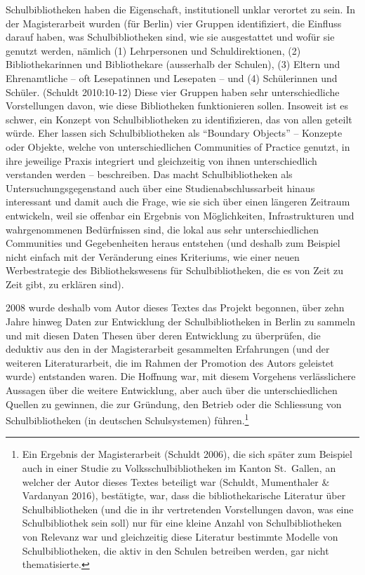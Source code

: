 \documentclass[a4paper,
fontsize=11pt,
oneside,
numbers=noperiodatend,
parskip=half-,
bibliography=totoc,
final
]{scrartcl}
\begin{document}
Schulbibliotheken haben die Eigenschaft, institutionell unklar verortet
zu sein. In der Magisterarbeit wurden (für Berlin) vier Gruppen
identifiziert, die Einfluss darauf haben, was Schulbibliotheken sind,
wie sie ausgestattet und wofür sie genutzt werden, nämlich (1)
Lehrpersonen und Schuldirektionen, (2) Bibliothekarinnen und
Bibliothekare (ausserhalb der Schulen), (3) Eltern und Ehrenamtliche --
oft Lesepatinnen und Lesepaten -- und (4) Schülerinnen und Schüler.
(Schuldt 2010:10-12) Diese vier Gruppen haben sehr unterschiedliche
Vorstellungen davon, wie diese Bibliotheken funktionieren sollen.
Insoweit ist es schwer, ein Konzept von Schulbibliotheken zu
identifizieren, das von allen geteilt würde. Eher lassen sich
Schulbibliotheken als \enquote{Boundary Objects} -- Konzepte oder
Objekte, welche von unterschiedlichen Communities of Practice genutzt,
in ihre jeweilige Praxis integriert und gleichzeitig von ihnen
unterschiedlich verstanden werden -- beschreiben. Das macht
Schulbibliotheken als Untersuchungsgegenstand auch über eine
Studienabschlussarbeit hinaus interessant und damit auch die Frage, wie
sie sich über einen längeren Zeitraum entwickeln, weil sie offenbar ein
Ergebnis von Möglichkeiten, Infrastrukturen und wahrgenommenen
Bedürfnissen sind, die lokal aus sehr unterschiedlichen Communities und
Gegebenheiten heraus entstehen (und deshalb zum Beispiel nicht einfach
mit der Veränderung eines Kriteriums, wie einer neuen Werbestrategie des
Bibliothekswesens für Schulbibliotheken, die es von Zeit zu Zeit gibt,
zu erklären sind).

2008 wurde deshalb vom Autor dieses Textes das Projekt begonnen, über
zehn Jahre hinweg Daten zur Entwicklung der Schulbibliotheken in Berlin
zu sammeln und mit diesen Daten Thesen über deren Entwicklung zu
überprüfen, die deduktiv aus den in der Magisterarbeit gesammelten
Erfahrungen (und der weiteren Literaturarbeit, die im Rahmen der
Promotion des Autors geleistet wurde) entstanden waren. Die Hoffnung
war, mit diesem Vorgehens verlässlichere Aussagen über die weitere
Entwicklung, aber auch über die unterschiedlichen Quellen zu gewinnen,
die zur Gründung, den Betrieb oder die Schliessung von Schulbibliotheken
(in deutschen Schulsystemen) führen.\footnote{Ein Ergebnis der
  Magisterarbeit (Schuldt 2006), die sich später zum Beispiel auch in
  einer Studie zu Volksschulbibliotheken im Kanton St.~Gallen, an
  welcher der Autor dieses Textes beteiligt war (Schuldt, Mumenthaler \&
  Vardanyan 2016), bestätigte, war, dass die bibliothekarische Literatur
  über Schulbibliotheken (und die in ihr vertretenden Vorstellungen
  davon, was eine Schulbibliothek sein soll) nur für eine kleine Anzahl
  von Schulbibliotheken von Relevanz war und gleichzeitig diese
  Literatur bestimmte Modelle von Schulbibliotheken, die aktiv in den
  Schulen betreiben werden, gar nicht thematisierte.}
\end{document}
